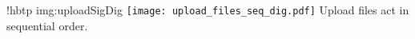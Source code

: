\namedfigure
{!hbtp}
{img:uploadSigDig}
{\texttt{[image: upload\_files\_seq\_dig.pdf]}}
{Upload files act in sequential order.}
